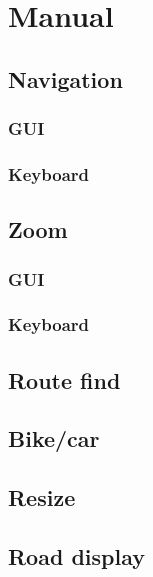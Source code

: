 \chapter{Manual}
\section{Navigation}
\subsection{GUI}
\subsection{Keyboard}

\section{Zoom}
\subsection{GUI}
\subsection{Keyboard}

\section{Route find}

\section{Bike/car}

\section{Resize}

\section{Road display}